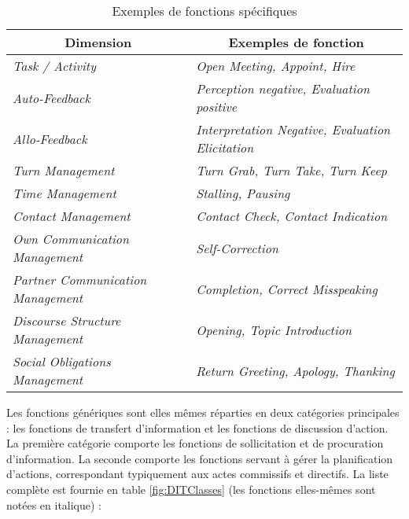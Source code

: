 \documentclass[10pt,a4paper,twoside]{article}
\begin{document}
\begin{table}[h]
	\centering
	\begin{tabular}{ll}
		\toprule
		\multicolumn{1}{c}{Dimension} & \multicolumn{1}{c}{Exemples de fonction} \\
		\midrule
		\textit{Task / Activity} & \textit{Open Meeting, Appoint, Hire } \\
		\textit{Auto-Feedback} & \textit{Perception negative, Evaluation positive} \\
		\textit{Allo-Feedback} & \textit{Interpretation Negative, Evaluation Elicitation} \\
		\textit{Turn Management} & \textit{Turn Grab, Turn Take, Turn Keep} \\
		\textit{Time Management} & \textit{Stalling, Pausing} \\
		\textit{Contact Management} & \textit{Contact Check, Contact Indication} \\
		\textit{Own Communication Management} & \textit{Self-Correction} \\
		\textit{Partner Communication Management} & \textit{Completion, Correct Misspeaking} \\
		\textit{Discourse Structure Management} & \textit{Opening, Topic Introduction} \\
		\textit{Social Obligations Management} & \textit{Return Greeting, Apology, Thanking} \\
		\bottomrule
	\end{tabular}
	\caption{Exemples de fonctions spécifiques}
	\label{fig:dimensionSpecificFunctions}
\end{table}

Les fonctions génériques sont elles mêmes réparties en deux catégories principales : les fonctions de transfert d'information et les fonctions de discussion d'action. La première catégorie comporte les fonctions de sollicitation et de procuration d'information. La seconde comporte les fonctions servant à gérer la planification d'actions, correspondant typiquement aux actes commissifs et directifs. La liste complète est fournie en table \ref{fig:DITClasses} (les fonctions elles-mêmes sont notées en italique) :
\end{document}
